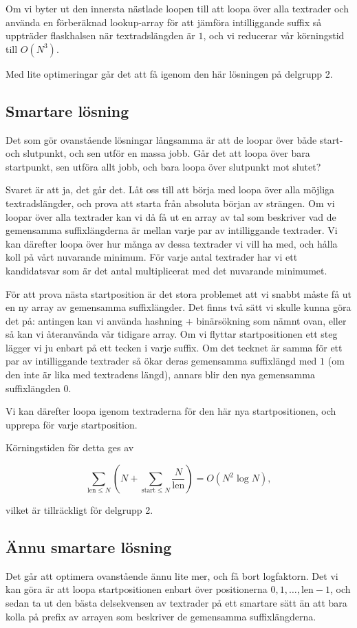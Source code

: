 Om vi byter ut den innersta nästlade loopen till att loopa över alla textrader och använda en förberäknad lookup-array för att jämföra intilliggande suffix så
uppträder flaskhalsen när textradslängden är $1$, och vi reducerar vår körningstid till $O(N^3)$.

Med lite optimeringar går det att få igenom den här lösningen på delgrupp 2.

\subsection*{Smartare lösning}
Det som gör ovanstående lösningar långsamma är att de loopar över både start- och slutpunkt, och sen utför en massa jobb.
Går det att loopa över bara startpunkt, sen utföra allt jobb, och bara loopa över slutpunkt mot slutet?

Svaret är att ja, det går det. Låt oss till att börja med loopa över alla möjliga textradslängder, och prova att starta från absoluta början av strängen.
Om vi loopar över alla textrader kan vi då få ut en array av tal som beskriver vad de gemensamma suffixlängderna är mellan
varje par av intilliggande textrader.
Vi kan därefter loopa över hur många av dessa textrader vi vill ha med, och hålla koll på vårt nuvarande minimum.
För varje antal textrader har vi ett kandidatsvar som är det antal multiplicerat med det nuvarande minimumet.

För att prova nästa startposition är det stora problemet att vi snabbt måste få ut en ny array av gemensamma suffixlängder.
Det finns två sätt vi skulle kunna göra det på: antingen kan vi använda hashning + binärsökning som nämnt ovan, eller så kan vi
återanvända vår tidigare array.
Om vi flyttar startpositionen ett steg lägger vi ju enbart på ett tecken i varje suffix.
Om det tecknet är samma för ett par av intilliggande textrader så ökar deras
gemensamma suffixlängd med $1$ (om den inte är lika med textradens längd),
annars blir den nya gemensamma suffixlängden $0$.

Vi kan därefter loopa igenom textraderna för den här nya startpositionen, och upprepa för varje startposition.

Körningstiden för detta ges av

\[ \sum_{\text{len} \le N} \left( N + \sum_{\text{start} \le N}\frac{N}{\text{len}} \right) = O(N^2 \log N), \]

vilket är tillräckligt för delgrupp 2.

\subsection*{Ännu smartare lösning}
Det går att optimera ovanstående ännu lite mer, och få bort logfaktorn.
Det vi kan göra är att loopa startpositionen enbart över positionerna $0, 1, \dots, \text{len}-1$,
och sedan ta ut den bästa delsekvensen av textrader på ett smartare sätt än att bara kolla på prefix av arrayen som beskriver de gemensamma suffixlängderna.

